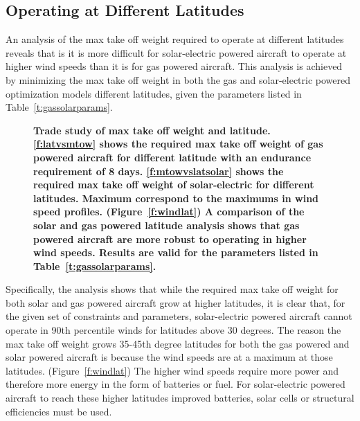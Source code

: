 \documentclass[]{aiaa-tc}%
\begin{document}
\subsection{Operating at Different Latitudes}

An analysis of the max take off weight required to operate at different latitudes reveals that is it is more difficult for solar-electric powered aircraft to operate at higher wind speeds than it is for gas powered aircraft.
This analysis is achieved by minimizing the max take off weight in both the gas and solar-electric powered optimization models different latitudes, given the parameters listed in Table~\ref{t:gassolarparams}.

\begin{figure}[H]
 \begin{subfigmatrix}{2}%
 \end{subfigmatrix}
 \caption{\textbf{ Trade study of max take off weight and latitude. \ref{f:latvsmtow} shows the required max take off weight of gas powered aircraft for different latitude with an endurance requirement of 8 days.  \ref{f:mtowvslatsolar} shows the required max take off weight of solar-electric for different latitudes. Maximum correspond to the maximums in wind speed profiles. (Figure~\ref{f:windlat}) A comparison of the solar and gas powered latitude analysis shows that gas powered aircraft are more robust to operating in higher wind speeds. Results are valid for the parameters listed in Table~\ref{t:gassolarparams}.}}
 \label{f:latvsmtowtrade}
\end{figure}

Specifically, the analysis shows that while the required max take off weight for both solar and gas powered aircraft grow at higher latitudes, it is clear that, for the given set of constraints and parameters, solar-electric powered aircraft cannot operate in 90th percentile winds for latitudes above 30 degrees.  
The reason the max take off weight grows 35-45th degree latitudes for both the gas powered and solar powered aircraft is because the wind speeds are at a maximum at those latitudes. (Figure~\ref{f:windlat})
The higher wind speeds require more power and therefore more energy in the form of batteries or fuel.  
For solar-electric powered aircraft to reach these higher latitudes improved batteries, solar cells or structural efficiencies must be used. \\
\end{document}
